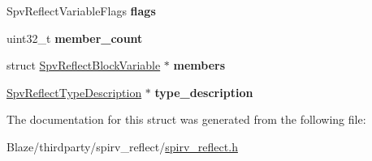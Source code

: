 \begin{DoxyCompactItemize}
\mbox{\label{structSpvReflectBlockVariable_aa6c6902a3e6964d44677a47670346adc}} 
Spv\+Reflect\+Variable\+Flags {\bfseries flags}
\item 
\mbox{\label{structSpvReflectBlockVariable_ab129ce3278c4791a3936916cd2f5305a}} 
uint32\+\_\+t {\bfseries member\+\_\+count}
\item 
\mbox{\label{structSpvReflectBlockVariable_a847804ec54be7eac9f8300dc371c582b}} 
struct \hyperlink{structSpvReflectBlockVariable}{Spv\+Reflect\+Block\+Variable} $\ast$ {\bfseries members}
\item 
\mbox{\label{structSpvReflectBlockVariable_a772d091a3bd20e8009618ad6521d3324}} 
\hyperlink{structSpvReflectTypeDescription}{Spv\+Reflect\+Type\+Description} $\ast$ {\bfseries type\+\_\+description}
\end{DoxyCompactItemize}


The documentation for this struct was generated from the following file\+:\begin{DoxyCompactItemize}
\item 
Blaze/thirdparty/spirv\+\_\+reflect/\hyperlink{spirv__reflect_8h}{spirv\+\_\+reflect.\+h}\end{DoxyCompactItemize}
